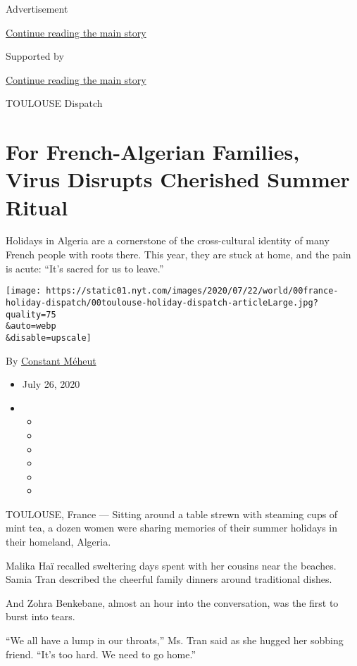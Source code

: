 Advertisement

\protect\hyperlink{after-top}{Continue reading the main story}

Supported by

\protect\hyperlink{after-sponsor}{Continue reading the main story}

TOULOUSE Dispatch

\hypertarget{for-french-algerian-families-virus-disrupts-cherished-summer-ritual}{%
\section{For French-Algerian Families, Virus Disrupts Cherished Summer
Ritual}\label{for-french-algerian-families-virus-disrupts-cherished-summer-ritual}}

Holidays in Algeria are a cornerstone of the cross-cultural identity of
many French people with roots there. This year, they are stuck at home,
and the pain is acute: ``It's sacred for us to leave.''

\texttt{[image: https://static01.nyt.com/images/2020/07/22/world/00france-holiday-dispatch/00toulouse-holiday-dispatch-articleLarge.jpg?quality=75\\\&auto=webp\\\&disable=upscale]}

By \href{https://www.nytimes.com/by/constant-meheut}{Constant Méheut}

\begin{itemize}
\item
  July 26, 2020
\item
  \begin{itemize}
  \item
  \item
  \item
  \item
  \item
  \item
  \end{itemize}
\end{itemize}

TOULOUSE, France --- Sitting around a table strewn with steaming cups of
mint tea, a dozen women were sharing memories of their summer holidays
in their homeland, Algeria.

Malika Haï recalled sweltering days spent with her cousins near the
beaches. Samia Tran described the cheerful family dinners around
traditional dishes.

And Zohra Benkebane, almost an hour into the conversation, was the first
to burst into tears.

``We all have a lump in our throats,'' Ms. Tran said as she hugged her
sobbing friend. ``It's too hard. We need to go home.''

